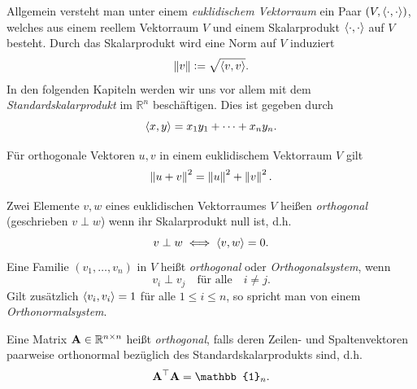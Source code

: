 Allgemein versteht man unter einem \textit{euklidischem Vektorraum} ein Paar $(V, \langle \cdot, \cdot \rangle)$, welches aus einem reellem Vektorraum $V$ und einem Skalarprodukt $\langle \cdot, \cdot \rangle$ auf $V$ besteht. Durch das Skalarprodukt wird eine Norm auf $V$ induziert
$$\left\lVert v \right\rVert \vcentcolon= \sqrt{\langle v, v \rangle}.$$
In den folgenden Kapiteln werden wir uns vor allem mit dem \textit{Standardskalarprodukt} im $\mathbb{R}^n$ beschäftigen. Dies ist gegeben durch 
$$\langle x, y \rangle = x_1y_1 + \cdots + x_ny_n.$$

\begin{thm}
\label{pythagoras}
Für orthogonale Vektoren $u,v$ in einem euklidischem Vektorraum $V$ gilt
$$\left\lVert u+v \right\rVert^2 = \left\lVert u \right\rVert^2 + \left\lVert v \right\rVert^2.$$
\end{thm}

\begin{defn}
Zwei Elemente $v, w$ eines euklidischen Vektorraumes $V$ heißen \textit{orthogonal} (geschrieben $v \perp w$) wenn ihr Skalarprodukt null ist, d.h.
$$v \perp w \iff \langle v, w \rangle = 0.$$
Eine Familie $(v_1, \ldots, v_n)$ in $V$ heißt \textit{orthogonal} oder \textit{Orthogonalsystem}, wenn
$$v_i \perp v_j \quad \text{für alle} \quad i \neq j.$$
Gilt zusätzlich $\langle v_i, v_i \rangle = 1$ für alle $1 \leq i \leq n$, so spricht man von einem \textit{Orthonormalsystem}.
\end{defn}



\begin{defn}
Eine Matrix $\mathbf{A} \in \mathbb{R}^{n \times n}$ heißt 		\textit{orthogonal}, falls deren Zeilen- und Spaltenvektoren paarweise orthonormal bezüglich des Standardskalarprodukts sind, d.h.
$$\mat A^{\top} \mat A = \mathbb{1}_n.$$
\end{defn}

